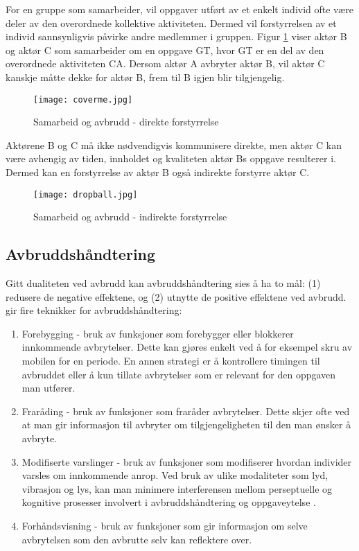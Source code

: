 \noindent
For en gruppe som samarbeider, vil oppgaver utført av et enkelt individ ofte være deler av den overordnede kollektive aktiviteten. Dermed vil forstyrrelsen av et individ sannsynligvis påvirke andre medlemmer i gruppen. Figur \ref{direkte} viser aktør B og aktør C som samarbeider om en oppgave GT, hvor GT er en del av den overordnede aktiviteten CA. Dersom aktør A avbryter aktør B, vil aktør C kanskje måtte dekke for aktør B, frem til B igjen blir tilgjengelig.
\begin{figure}[H]
\centering
\texttt{[image: coverme.jpg]}
\caption{Samarbeid og avbrudd - direkte forstyrrelse}
\label{direkte}
\end{figure}

\noindent
Aktørene B og C må ikke nødvendigvis kommunisere direkte, men aktør C kan være avhengig av tiden, innholdet og kvaliteten aktør Bs oppgave resulterer i. Dermed kan en forstyrrelse av aktør B også indirekte forstyrre aktør C.
\begin{figure}[H]
\centering
\texttt{[image: dropball.jpg]}
\caption{Samarbeid og avbrudd - indirekte forstyrrelse}
\label{indirekte}
\end{figure}

\subsection{Avbruddshåndtering}
Gitt dualiteten ved avbrudd kan avbruddshåndtering sies å ha to mål: (1) redusere de negative effektene, og (2) utnytte de positive effektene ved avbrudd. \citet{Grandhi10} gir fire teknikker for avbruddshåndtering:
\begin{enumerate}        
\item Forebygging - bruk av funksjoner som forebygger eller blokkerer innkommende avbrytelser. Dette kan gjøres enkelt ved å for eksempel skru av mobilen for en periode. En annen strategi er å kontrollere timingen til avbruddet eller å kun tillate avbrytelser som er relevant for den oppgaven man utfører.

\item Fraråding - bruk av funksjoner som fraråder avbrytelser. Dette skjer ofte ved at man gir informasjon til avbryter om tilgjengeligheten til den man ønsker å avbryte. 

\item Modifiserte varslinger - bruk av funksjoner som modifiserer hvordan individer varsles om innkommende anrop. Ved bruk av ulike modaliteter som lyd, vibrasjon og lys, kan man minimere interferensen mellom perseptuelle og kognitive prosesser involvert i avbruddshåndtering og oppgaveytelse \citep{Harr07}.

\item Forhåndsvisning - bruk av funksjoner som gir informasjon om selve avbrytelsen som den avbrutte selv kan reflektere over.   
\end{enumerate}

